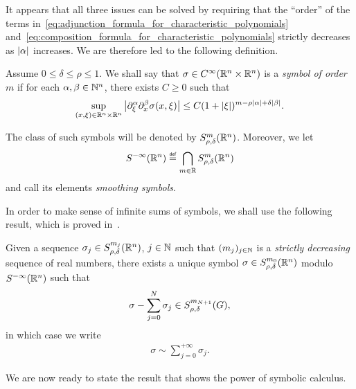It appears that all three issues can be solved by requiring
that the ``order'' of the terms in~\eqref{eq:adjunction_formula_for_characteristic_polynomials} and~\eqref{eq:composition_formula_for_characteristic_polynomials} strictly decreases as $\abs \alpha$ increases.
We are therefore led to the following definition.
\begin{definition}
    Assume $0 \leq \delta \leq \rho \leq 1$.
    We shall say that $\sigma \in \SmoothFunctions {\R^n \times \R^n}$ is a \emph{symbol of order $m$}
    if for each $\alpha, \beta \in \N^n$,
    there exists $C \geq 0$ such that
    \begin{align*}
        \sup_{(x, \xi) \in \R^n \times \R^n} \abs {\iD{\xi^\alpha} \iD{x^\beta}\sigma(x, \xi)} \leq C (1 + \abs \xi)^{m - \rho \abs \alpha + \delta \abs \beta}.
    \end{align*}

    The class of such symbols will be denoted by $\SymbolClass [\R^n] m {\rho, \delta}$.
    Moreover, we let
    \begin{align*}
        \SmoothingSymbols [\R^n] \defeq \bigcap_{m \in \R} \SymbolClass [\R^n] m {\rho, \delta}
    \end{align*}
    and call its elements \emph{smoothing symbols}.
\end{definition}

In order to make sense of infinite sums of symbols,
we shall use the following result,
which is proved in~\cite[Proposition~2.5.33]{RuzhanskyTurunen10}.

\begin{lemma}
    Given a sequence $\sigma_j \in \SymbolClass [\R^n] {m_j} {\rho, \delta}$, $j \in \N$ such that $(m_j)_{j \in \N}$ is a \emph{strictly decreasing} sequence of real numbers,
    there exists a unique symbol $\sigma \in \SymbolClass [\R^n] {m_0} {\rho, \delta}$ modulo $\SmoothingSymbols [\R^n]$ such that
    \begin{align*}
        \sigma - \sum_{j = 0}^N \sigma_j \in \SymbolClass {m_{N + 1}} {\rho, \delta},
    \end{align*}
    in which case we write
    \begin{align*}
        \sigma \sim \sum_{j = 0}^{+\infty} \sigma_j.
    \end{align*}
\end{lemma}

We are now ready to state the result
that shows the power of symbolic calculus.


